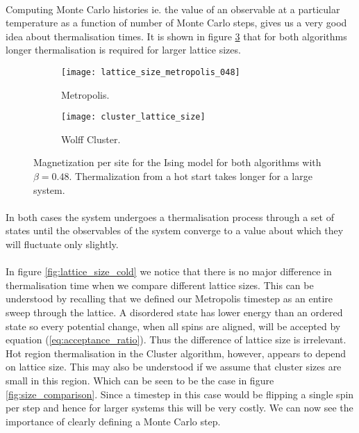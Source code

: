 \documentclass[12pt] {report} %
\begin{document}
			\paragraph{}
				Computing Monte Carlo histories ie. the value of an observable at a particular temperature as a function of number of Monte Carlo steps, gives us a very good idea about thermalisation times. It is shown in figure \ref{fig:thermalisation_V_size} that for both algorithms longer thermalisation is required for larger lattice sizes.
				
			\begin{figure}[H]
				\centering
				\begin{subfigure}[h]{0.49\textwidth}
					\centering
					\texttt{[image: lattice\_size\_metropolis\_048]}
					\caption{Metropolis.}
					\label{fig:lattice_size_metropolis_0.48}
				\end{subfigure}
				\hfill
				\begin{subfigure}[h]{0.49\textwidth}
					\centering
					\texttt{[image: cluster\_lattice\_size]}
					\caption{Wolff Cluster.}
					\label{fig:cluster_lattice size}
				\end{subfigure} 
				\caption{Magnetization per site for the Ising model for both algorithms with
				$\beta = 0.48$. Thermalization from a hot start takes longer for a large system.}
				\label{fig:thermalisation_V_size}
			\end{figure}
			
			\paragraph{}
				In both cases the system undergoes a thermalisation process through a set of states until the observables of the system converge to a value about which they will fluctuate only slightly.
				
			\paragraph{}
				In figure \ref{fig:lattice_size_cold} we notice that there is no major difference in thermalisation time when we compare different lattice sizes. This can be understood by recalling that we defined our Metropolis timestep as an entire sweep through the lattice. A disordered state has lower energy than an ordered state so every potential change, when all spins are aligned, will be accepted by equation (\ref{eq:acceptance_ratio}). Thus the difference of lattice size is irrelevant. Hot region thermalisation in  the Cluster algorithm, however, appears to depend on lattice size. This may also be understood if we assume that cluster sizes are small in this region. Which can be seen to be the case in figure \ref{fig:size_comparison}. Since a timestep in this case would be flipping a single spin per step and hence for larger systems this will be very costly. We can now see the importance of clearly defining a Monte Carlo step. 
			
\end{document}
